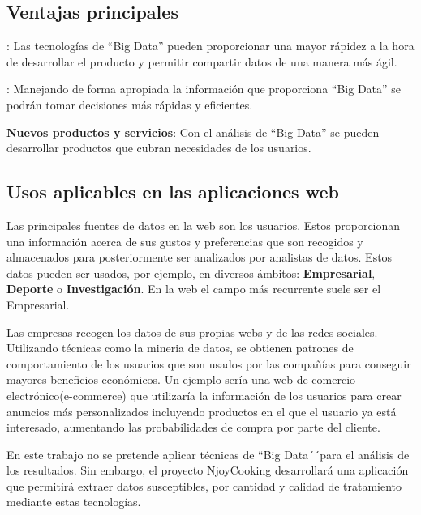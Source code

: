 \subsection{Ventajas principales}


\begin{description}
  \item [Reducción de costes]: Las tecnologías de ``Big Data'' pueden proporcionar una mayor rápidez a la hora de desarrollar el producto y permitir compartir datos de una manera más ágil.
  \item [Toma de decisiones rápida]: Manejando de forma apropiada la información que proporciona ``Big Data'' se podrán tomar
  decisiones más rápidas y eficientes.
  \item \textbf{Nuevos productos y servicios}: Con el análisis de ``Big Data'' se pueden desarrollar productos que cubran necesidades de los usuarios.
\end{description}

\subsection{Usos aplicables en las aplicaciones web}

Las principales fuentes de datos en la web son los usuarios. Estos proporcionan una información acerca de sus gustos y preferencias que son
recogidos y almacenados para posteriormente ser analizados por analistas de datos. Estos datos pueden ser usados, por ejemplo, en diversos ámbitos: \textbf{Empresarial}, \textbf{Deporte} o \textbf{Investigación}. En la web el campo más recurrente suele ser el Empresarial.

\vspace{5 mm}

Las empresas recogen los datos de sus propias webs y de las redes sociales. Utilizando técnicas como la mineria de datos, se obtienen patrones de comportamiento de los usuarios que son usados por las compañías para conseguir mayores beneficios económicos. Un ejemplo sería una web de comercio electrónico(e-commerce) que utilizaría la información de los usuarios para crear anuncios más personalizados incluyendo productos en el que el usuario ya está interesado, aumentando las probabilidades de compra por parte del cliente.

En este trabajo no se pretende aplicar técnicas de ``Big Data´´para el análisis de los resultados. Sin embargo, el proyecto NjoyCooking desarrollará una aplicación que permitirá extraer datos susceptibles, por cantidad y calidad de tratamiento mediante estas tecnologías.

